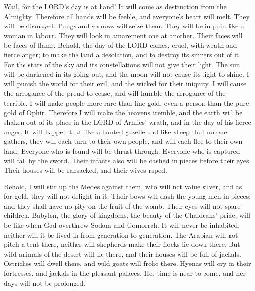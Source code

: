  Wail, for the LORD's day is at hand! It will come as
destruction from the Almighty.  Therefore all hands will
be feeble, and everyone's heart will melt.  They will be
dismayed. Pangs and sorrows will seize them. They will be in pain like a
woman in labour. They will look in amazement one at another. Their faces
will be faces of flame.  Behold, the day of the LORD
comes, cruel, with wrath and fierce anger; to make the land a
desolation, and to destroy its sinners out of it.  For
the stars of the sky and its constellations will not give their light.
The sun will be darkened in its going out, and the moon will not cause
its light to shine.  I will punish the world for their
evil, and the wicked for their iniquity. I will cause the arrogance of
the proud to cease, and will humble the arrogance of the terrible.
 I will make people more rare than fine gold, even a
person than the pure gold of Ophir.  Therefore I will
make the heavens tremble, and the earth will be shaken out of its place
in the LORD of Armies' wrath, and in the day of his fierce anger.
 It will happen that like a hunted gazelle and like sheep
that no one gathers, they will each turn to their own people, and will
each flee to their own land.  Everyone who is found will
be thrust through. Everyone who is captured will fall by the sword.
 Their infants also will be dashed in pieces before their
eyes. Their houses will be ransacked, and their wives raped.

 Behold, I will stir up the Medes against them, who will
not value silver, and as for gold, they will not delight in it.
 Their bows will dash the young men in pieces; and they
shall have no pity on the fruit of the womb. Their eyes will not spare
children.  Babylon, the glory of kingdoms, the beauty of
the Chaldeans' pride, will be like when God overthrew Sodom and
Gomorrah.  It will never be inhabited, neither will it be
lived in from generation to generation. The Arabian will not pitch a
tent there, neither will shepherds make their flocks lie down there.
 But wild animals of the desert will lie there, and their
houses will be full of jackals. Ostriches will dwell there, and wild
goats will frolic there.  Hyenas will cry in their
fortresses, and jackals in the pleasant palaces. Her time is near to
come, and her days will not be prolonged.

